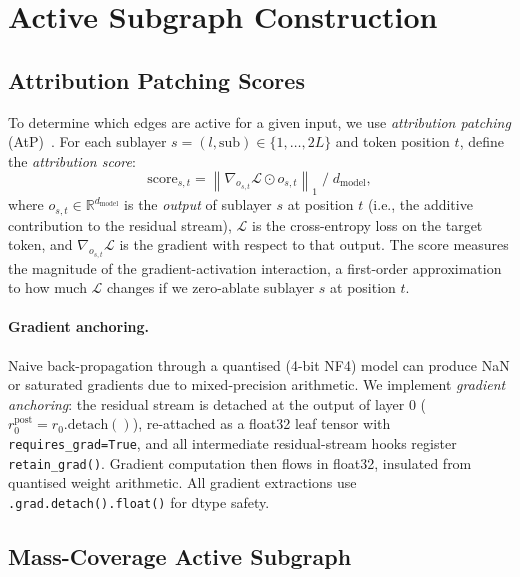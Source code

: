 \documentclass{article}
\newcommand{\R}{\mathbb{R}}
\newcommand{\Lcal}{\mathcal{L}}
\newcommand{\dmodel}{d_{\mathrm{model}}}
\newcommand{\score}{\mathrm{score}}
\begin{document}
\section{Active Subgraph Construction}
\label{sec:active}

\subsection{Attribution Patching Scores}
\label{sec:atp}

To determine which edges are active for a given input, we use \emph{attribution
patching} (AtP)~\citep{goldowsky2023localizing,kramar2024atp}.
For each sublayer $s = (l, \mathrm{sub}) \in \{1,\ldots,2L\}$ and token position $t$,
define the \emph{attribution score}:
\begin{equation}
  \score_{s,t} = \left\| \nabla_{o_{s,t}} \Lcal \odot o_{s,t} \right\|_1
  \;\Big/ \; \dmodel,
  \label{eq:score}
\end{equation}
where $o_{s,t} \in \R^{\dmodel}$ is the \emph{output} of sublayer $s$ at position $t$
(i.e., the additive contribution to the residual stream),
$\Lcal$ is the cross-entropy loss on the target token,
and $\nabla_{o_{s,t}} \Lcal$ is the gradient with respect to that output.
The score measures the magnitude of the gradient-activation interaction, a first-order
approximation to how much $\Lcal$ changes if we zero-ablate sublayer $s$ at position $t$.

\paragraph{Gradient anchoring.}
Naive back-propagation through a quantised (4-bit NF4) model can produce NaN or
saturated gradients due to mixed-precision arithmetic.  We implement
\emph{gradient anchoring}: the residual stream is detached at the output of layer 0
($r_0^{\mathrm{post}} = r_0.\mathrm{detach}()$), re-attached as a float32 leaf
tensor with \texttt{requires\_grad=True}, and all intermediate residual-stream
hooks register \texttt{retain\_grad()}.  Gradient computation then flows in float32,
insulated from quantised weight arithmetic.  All gradient extractions use
\texttt{.grad.detach().float()} for dtype safety.

\subsection{Mass-Coverage Active Subgraph}
\label{sec:masscoverage}
\end{document}
